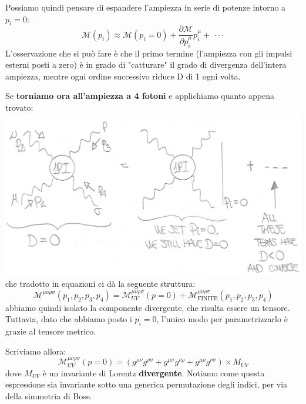 \documentclass[../main.tex]{subfiles}
\begin{document}
\begin{enumerate}
                Possiamo quindi pensare di espandere l'ampiezza in serie di potenze intorno a $p_i=0$:
                \begin{equation}
                    \mathscr{M}(p_i) \approx \mathscr{M}(p_i=0) + \frac{\partial\mathscr{M}}{\partial p_i^\mu}p_i^\mu +\, \cdot\cdot\cdot
                    \label{eq:amplit_powerseries}
                \end{equation}
                L'osservazione che si può fare è che il primo termine (l'ampiezza con gli impulsi esterni posti a zero) è in grado di "catturare" il grado di divergenza dell'intera ampiezza, mentre ogni ordine successivo riduce D di 1 ogni volta. 

                Se \textbf{torniamo ora all'ampiezza a 4 fotoni} e applichiamo quanto appena trovato:\\
                \includegraphics[]{images/4phot_expansion.jpg}\\
                che tradotto in equazioni ci dà la seguente struttura:
                \[
                \mathscr{M}^{\mu\nu\rho\sigma}(p_1,p_2,p_3,p_4) = \mathscr{M}^{\mu\nu\rho\sigma}_{UV}(p=0)+ \mathscr{M}^{\mu\nu\rho\sigma}_{\text{FINITE}}(p_1,p_2,p_3,p_4)
                \]
                abbiamo quindi isolato la componente divergente, che risulta essere un tensore. Tuttavia, dato che abbiamo posto i $p_i=0$, l'unico modo per parametrizzarlo è grazie al tensore metrico.

                Scriviamo allora:
                \begin{equation}
                \mathscr{M}^{\mu\nu\rho\sigma}_{UV}(p=0) = (g^{\mu\nu}g^{\rho\sigma} + g^{\mu\sigma}g^{\nu\rho} + g^{\mu\rho}g^{\nu\sigma})\times M_{UV}
                \label{eq:amplit_divergent_structure}
                \end{equation}
                dove $M_{UV}$ è un invariante di Lorentz \textbf{divergente}. Notiamo come questa espressione sia invariante sotto una generica permutazione degli indici, per via della simmetria di Bose.


\end{enumerate}
\end{document}
